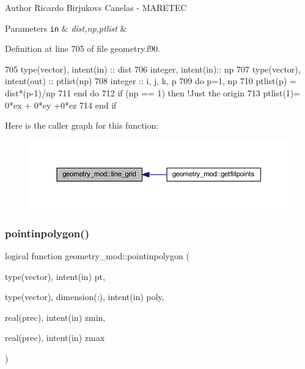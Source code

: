 \begin{DoxyAuthor}{Author}
Ricardo Birjukovs Canelas -\/ M\+A\+R\+E\+T\+EC 
\end{DoxyAuthor}

\begin{DoxyParams}[1]{Parameters}
\mbox{\tt in}  & {\em dist,np,ptlist} & \\
\hline
\end{DoxyParams}


Definition at line 705 of file geometry.\+f90.


\begin{DoxyCode}
705     \textcolor{keywordtype}{type}(vector), \textcolor{keywordtype}{intent(in)} :: dist
706     \textcolor{keywordtype}{integer}, \textcolor{keywordtype}{intent(in)}::  np
707     \textcolor{keywordtype}{type}(vector), \textcolor{keywordtype}{intent(out)} :: ptlist(np)
708     \textcolor{keywordtype}{integer} :: i, j, k, p
709     \textcolor{keywordflow}{do} p=1, np
710         ptlist(p) = dist*(p-1)/np
711 \textcolor{keywordflow}{    end do}
712     \textcolor{keywordflow}{if} (np == 1) \textcolor{keywordflow}{then} \textcolor{comment}{!Just the origin}
713         ptlist(1)= 0*ex + 0*ey +0*ez
714 \textcolor{keywordflow}{    end if}
\end{DoxyCode}
Here is the caller graph for this function\+:\nopagebreak
\begin{figure}[H]
\begin{center}
\leavevmode
\includegraphics[width=350pt]{namespacegeometry__mod_a48e38bde8ea77f5e1bb42d3fa2c85037_icgraph}
\end{center}
\end{figure}
\mbox{\label{namespacegeometry__mod_a51bc27aa95191008da7496c7b67b1bf4}} 
\subsubsection{\texorpdfstring{pointinpolygon()}{pointinpolygon()}}
{\footnotesize\ttfamily logical function geometry\+\_\+mod\+::pointinpolygon (\begin{DoxyParamCaption}\item[{type(vector), intent(in)}]{pt,  }\item[{type(vector), dimension(\+:), intent(in)}]{poly,  }\item[{real(prec), intent(in)}]{zmin,  }\item[{real(prec), intent(in)}]{zmax }\end{DoxyParamCaption})\hspace{0.3cm}{\ttfamily [private]}}



